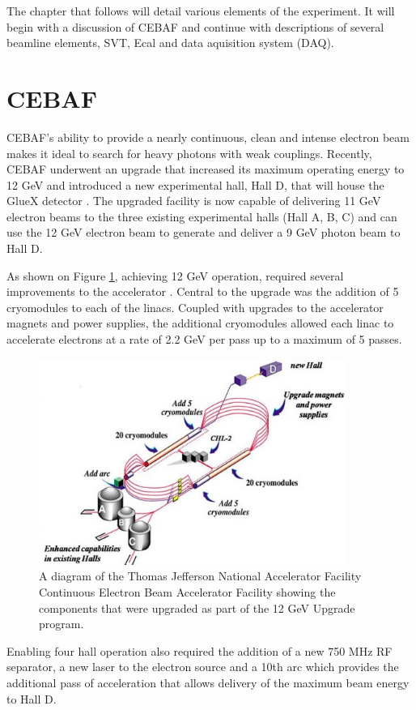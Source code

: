 The chapter that follows will detail various elements of the experiment.
It will begin with a discussion of CEBAF and continue with descriptions
of several beamline elements, SVT, Ecal and data aquisition system (DAQ).

\section{CEBAF}

CEBAF's ability to provide a nearly continuous, clean and intense electron
beam makes it ideal to search for heavy photons with weak couplings. Recently,
CEBAF underwent an upgrade that increased its maximum operating energy to 12
GeV and introduced a new experimental hall, Hall D, that will house the
GlueX detector \cite{Dudek:2012vr}.  The upgraded facility is now capable of 
delivering 11 GeV electron beams to the three existing experimental halls
(Hall A, B, C) and can use the 12 GeV electron beam to generate and deliver a 9
GeV photon beam to Hall D. 

As shown on Figure \ref{fig:cebaf}, achieving 12 GeV operation, required several
improvements to the accelerator \cite{Burkert:2012rh}. Central to the upgrade 
was the addition of 5 
cryomodules to each of the linacs.  Coupled with upgrades to the accelerator
magnets and power supplies, the additional cryomodules allowed each linac to
accelerate electrons at a rate of 2.2 GeV per pass up to a maximum of 5 passes.
\begin{figure}[h]
    \centering
    \includegraphics[width=0.9\textwidth]{images/cebaf.jpg}
    \caption{A diagram of the Thomas Jefferson National Accelerator Facility
             Continuous Electron Beam Accelerator Facility showing the 
             components that were upgraded as part of the 12 GeV Upgrade 
             program.}
    \label{fig:cebaf}
\end{figure}
Enabling four hall operation also required the addition of a new 750 MHz RF 
separator, a new laser to the electron source and a 10th arc which provides
the additional pass of acceleration that allows 
delivery of the maximum beam energy to Hall D.


